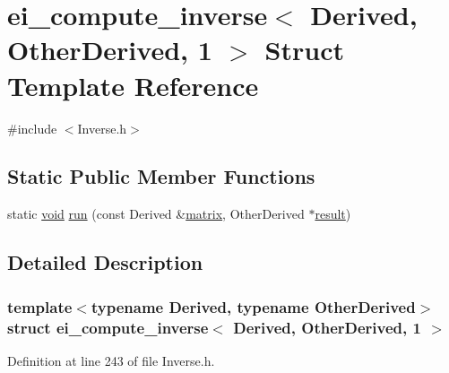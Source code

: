 \hypertarget{structei__compute__inverse_3_01_derived_00_01_other_derived_00_011_01_4}{\section{ei\-\_\-compute\-\_\-inverse$<$ Derived, Other\-Derived, 1 $>$ Struct Template Reference}
\label{structei__compute__inverse_3_01_derived_00_01_other_derived_00_011_01_4}
}


{\ttfamily \#include $<$Inverse.\-h$>$}

\subsection*{Static Public Member Functions}
\begin{DoxyCompactItemize}
\item 
static \hyperlink{group___u_a_v_objects_plugin_ga444cf2ff3f0ecbe028adce838d373f5c}{void} \hyperlink{structei__compute__inverse_3_01_derived_00_01_other_derived_00_011_01_4_a92f04fa0f5900a23157cb626d53202f4}{run} (const Derived \&\hyperlink{glext_8h_a7b24a3f2f56eb1244ae69dacb4fecb6f}{matrix}, Other\-Derived $\ast$\hyperlink{qxtslotjob_8h_aab161efab0511ea9612b64c40e9852ca}{result})
\end{DoxyCompactItemize}


\subsection{Detailed Description}
\subsubsection*{template$<$typename Derived, typename Other\-Derived$>$struct ei\-\_\-compute\-\_\-inverse$<$ Derived, Other\-Derived, 1 $>$}



Definition at line 243 of file Inverse.\-h.



